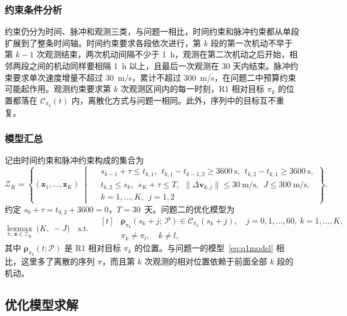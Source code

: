 \subsubsection{约束条件分析}

约束仍分为时间、脉冲和观测三类，与问题一相比，时间约束和脉冲约束都从单段扩展到了整条时间轴。时间约束要求各段依次进行，第 $k$ 段的第一次机动不早于第 $k-1$ 次观测结束，两次机动间隔不少于 1~h，观测在第二次机动之后开始，相邻两段之间的机动同样要相隔 1~h 以上，且最后一次观测在 30 天内结束。脉冲约束要求单次速度增量不超过 30~m/s，累计不超过 300~m/s，在问题二中预算约束可能起作用。观测约束要求第 $k$ 次观测区间内的每一时刻，R1 相对目标 $\pi_k$ 的位置都落在 $\mathcal C_{\pi_k}(t)$ 内，离散化方式与问题一相同。此外，序列中的目标互不重复。

\subsubsection{模型汇总}

记由时间约束和脉冲约束构成的集合为
\begin{equation}
  \mathcal Z_K = \left\{(\bm z_1,\dots,\bm z_K) \;\middle|\;
  \begin{aligned}
    & s_{k-1} + \tau \le t_{k,1},\ \ t_{k,1} - t_{k-1,2} \ge 3600~\mathrm s,\ \ t_{k,2} - t_{k,1} \ge 3600~\mathrm s, \\
    & t_{k,2} \le s_k,\ \ s_K + \tau \le T,\ \ \|\Delta\bm v_{k,j}\| \le 30~\mathrm{m/s},\ \ J \le 300~\mathrm{m/s}, \\
    & k = 1,\dots,K,\ \ j = 1, 2
  \end{aligned}
  \right\},
  \label{eq:q2set}
\end{equation}
约定 $s_0 + \tau = t_{0,2} + 3600 = 0$，$T = 30$~天。问题二的优化模型为
\begin{equation}
  \operatorname*{lexmax}_{\pi,\ \bm z\in\mathcal Z_K}\ \big(K,\ -J\big) \quad \text{s.t.}\quad
  \begin{aligned}[t]
    & \bm\rho_{\pi_k}(s_k + j;\,\mathcal P) \in \mathcal C_{\pi_k}(s_k + j),\quad j = 0, 1, \dots, 60,\ k = 1, \dots, K, \\
    & \pi_k \ne \pi_l,\quad k \ne l ,
  \end{aligned}
  \label{eq:q2model}
\end{equation}
其中 $\bm\rho_{\pi_k}(t;\mathcal P)$ 是 R1 相对目标 $\pi_k$ 的位置。与问题一的模型~\eqref{eq:q1model} 相比，这里多了离散的序列 $\pi$，而且第 $k$ 次观测的相对位置依赖于前面全部 $k$ 段的机动。

\subsection{优化模型求解}

